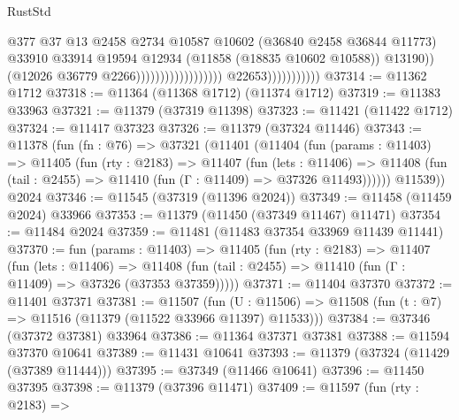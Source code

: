 \begin{lexlean}{RustStd}
\begin{coremodule}
                                                                @377
                                                                @37
                                                                @13
                                                                @2458
                                                                @2734
                                                                @10587
                                                                @10602
                                                                (@36840 @2458 @36844 @11773)
                                                                @33910
                                                                @33914
                                                                @19594
                                                                @12934
                                                                (@11858 (@18835 @10602 @10588))
                                                                @13190))
                                                            (@12026 @36779 @2266))))))))))))))))))
                          @22653)))))))))))
@37314 := @11362 @1712
@37318 := @11364 (@11368 @1712) (@11374 @1712)
@37319 := @11383 @33963
@37321 := @11379 (@37319 @11398)
@37323 := @11421 (@11422 @1712)
@37324 := @11417 @37323
@37326 := @11379 (@37324 @11446)
@37343 := @11378
    (fun (fn : @76) =>
    @37321
      (@11401
        (@11404
          (fun (params : @11403) =>
          @11405
            (fun (rty : @2183) =>
            @11407
              (fun (lets : @11406) =>
              @11408 (fun (tail : @2455) => @11410 (fun (Γ : @11409) => @37326 @11493))))))
        @11539))
    @2024
@37346 := @11545 (@37319 (@11396 @2024))
@37349 := @11458 (@11459 @2024) @33966
@37353 := @11379 (@11450 (@37349 @11467) @11471)
@37354 := @11484 @2024
@37359 := @11481 (@11483 @37354 @33969 @11439 @11441)
@37370 := fun (params : @11403) =>
  @11405
    (fun (rty : @2183) =>
    @11407
      (fun (lets : @11406) =>
      @11408 (fun (tail : @2455) => @11410 (fun (Γ : @11409) => @37326 (@37353 @37359)))))
@37371 := @11404 @37370
@37372 := @11401 @37371
@37381 := @11507
    (fun (U : @11506) => @11508 (fun (t : @7) => @11516 (@11379 (@11522 @33966 @11397) @11533)))
@37384 := @37346 (@37372 @37381) @33964
@37386 := @11364 @37371 @37381
@37388 := @11594 @37370 @10641
@37389 := @11431 @10641
@37393 := @11379 (@37324 (@11429 (@37389 @11444)))
@37395 := @37349 (@11466 @10641)
@37396 := @11450 @37395
@37398 := @11379 (@37396 @11471)
@37409 := @11597
    (fun (rty : @2183) =>

\end{coremodule}
\end{lexlean}
